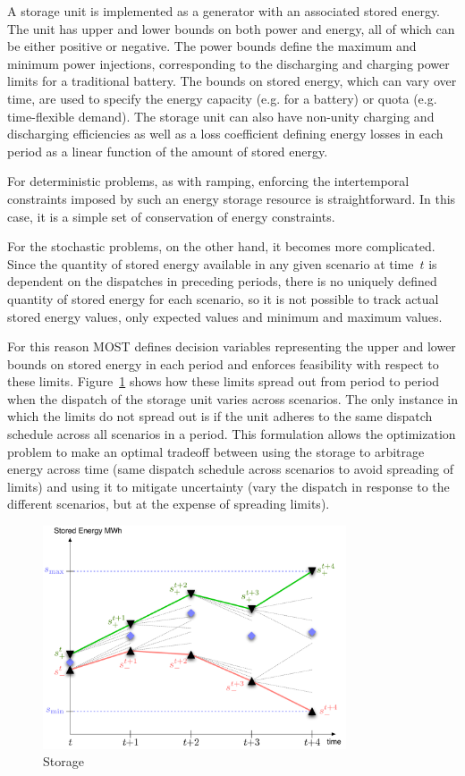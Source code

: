 \documentclass[12pt]{article}
\newcommand{\most}[0]{{MOST}}
\numberwithin{equation}{section}
\numberwithin{table}{section}
\numberwithin{figure}{section}
\begin{document}
A storage unit is implemented as a generator with an associated stored energy. The unit has upper and lower bounds on both power and energy, all of which can be either positive or negative. The power bounds define the maximum and minimum power injections, corresponding to the discharging and charging power limits for a traditional battery. The bounds on stored energy, which can vary over time, are used to specify the energy capacity (e.g. for a battery) or quota (e.g. time-flexible demand). The storage unit can also have non-unity charging and discharging efficiencies as well as a loss coefficient defining energy losses in each period as a linear function of the amount of stored energy.

For deterministic problems, as with ramping, enforcing the intertemporal constraints imposed by such an energy storage resource is straightforward. In this case, it is a simple set of conservation of energy constraints.

For the stochastic problems, on the other hand, it becomes more complicated. Since the quantity of stored energy available in any given scenario at time~$t$ is dependent on the dispatches in preceding periods, there is no uniquely defined quantity of stored energy for each scenario, so it is not possible to track actual stored energy values, only expected values and minimum and maximum values.

For this reason \most{} defines decision variables representing the upper and lower bounds on stored energy in each period and enforces feasibility with respect to these limits. Figure~\ref{fig:storage} shows how these limits spread out from period to period when the dispatch of the storage unit varies across scenarios. The only instance in which the limits do not spread out is if the unit adheres to the same dispatch schedule across all scenarios in a period. This formulation allows the optimization problem to make an optimal tradeoff between using the storage to arbitrage energy across time (same dispatch schedule across scenarios to avoid spreading of limits) and using it to mitigate uncertainty (vary the dispatch in response to the different scenarios, but at the expense of spreading limits).

\begin{figure}[tp]
  \centering
  \includegraphics[width=0.8\textwidth]{./figures/storage-18}
  \caption{Storage}
  \label{fig:storage}
\end{figure}
\end{document}

